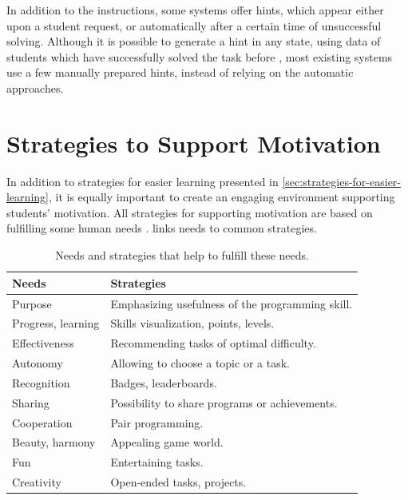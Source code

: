 In addition to the instructions, some systems offer hints, which appear either
  upon a student request, or automatically after a certain time of unsuccessful
  solving. Although it is possible to generate a hint in any state,
  using data of students which have successfully solved the task before
  \cite{generating-hints}, most existing systems use a few manually prepared
  hints, instead of relying on the automatic approaches.

\section{Strategies to Support Motivation}
\label{sec:motivation}

In addition to strategies for easier learning presented in
\cref{sec:strategies-for-easier-learning}, it is equally important to create an
engaging environment supporting students’ motivation.
All strategies for supporting motivation are based on fulfilling some human
needs \cite{nvc}. %
 links needs to common strategies.

\begin{table}[htb]
\centering
\caption{Needs and strategies that help to fulfill these needs.}
\begin{tabular}{ll}
\toprule
Needs & Strategies \\
\midrule
Purpose & Emphasizing usefulness of the programming skill. \\ %
Progress, learning & Skills visualization, points, levels. \\
Effectiveness & Recommending tasks of optimal difficulty. \\ %
Autonomy & Allowing to choose a topic or a task. \\
Recognition & Badges, leaderboards. \\  %
Sharing & Possibility to share programs or achievements. \\
Cooperation & Pair programming. \\
Beauty, harmony & Appealing game world. \\ %
Fun & Entertaining tasks. \\
Creativity & Open-ended tasks, projects. \\  %
\bottomrule
\end{tabular}
\label{tbl:motivation-strategies}
\end{table}



